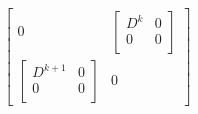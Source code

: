 \begin{dmath}\label{eqn:threeSpringLoopattemptII:660}
\begin{bmatrix}
0
&
\begin{bmatrix}
D^k & 0 \\
0 &   0 \\
\end{bmatrix}
\\
\begin{bmatrix}
D^{k+1} & 0 \\
0 &   0 \\
\end{bmatrix}
&
0
\end{bmatrix}

\end{dmath}
